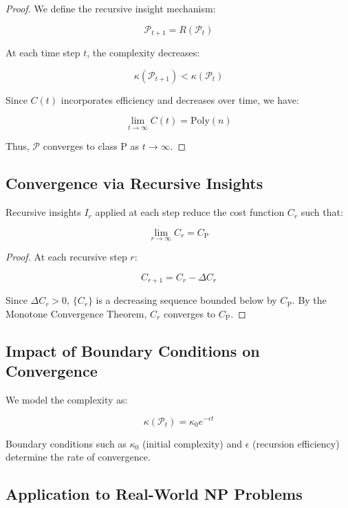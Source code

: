 \documentclass{article}
\begin{document}
\begin{proof}
We define the recursive insight mechanism:

\[
\mathcal{P}_{t+1} = R(\mathcal{P}_t)
\]

At each time step \( t \), the complexity decreases:

\[
\kappa(\mathcal{P}_{t+1}) < \kappa(\mathcal{P}_t)
\]

Since \( C(t) \) incorporates efficiency and decreases over time, we have:

\[
\lim_{t \rightarrow \infty} C(t) = \text{Poly}(n)
\]

Thus, \( \mathcal{P} \) converges to class P as \( t \rightarrow \infty \).
\end{proof}

\subsection{Convergence via Recursive Insights}

\begin{theorem}
Recursive insights \( I_r \) applied at each step reduce the cost function \( C_r \) such that:

\[
\lim_{r \rightarrow \infty} C_r = C_{\text{P}}
\]
\end{theorem}

\begin{proof}
At each recursive step \( r \):

\[
C_{r+1} = C_r - \Delta C_r
\]

Since \( \Delta C_r > 0 \), \( \{ C_r \} \) is a decreasing sequence bounded below by \( C_{\text{P}} \). By the Monotone Convergence Theorem, \( C_r \) converges to \( C_{\text{P}} \).
\end{proof}

\subsection{Impact of Boundary Conditions on Convergence}

We model the complexity as:

\begin{equation}
\kappa(\mathcal{P}_t) = \kappa_0 e^{- \epsilon t}
\end{equation}

Boundary conditions such as \( \kappa_0 \) (initial complexity) and \( \epsilon \) (recursion efficiency) determine the rate of convergence.

\subsection{Application to Real-World NP Problems}
\end{document}
